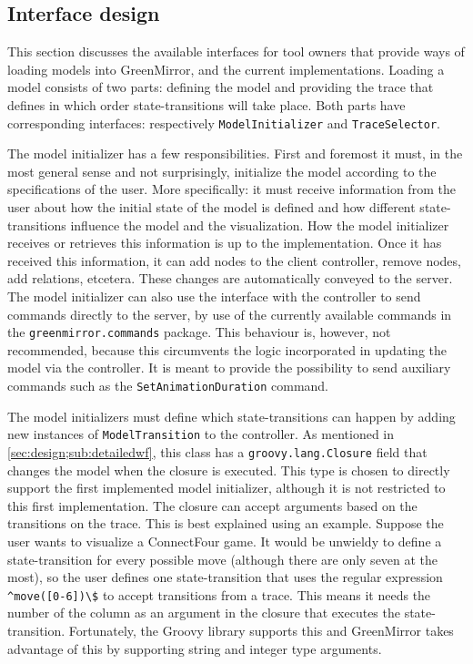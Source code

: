 \subsection{Interface design}\label{sec:design;sub:interface}
This section discusses the available interfaces for tool owners that provide ways of loading models into GreenMirror, and the current implementations. Loading a model consists of two parts: defining the model and providing the trace that defines in which order state-transitions will take place. Both parts have corresponding interfaces: respectively \lstinline{ModelInitializer} and \lstinline{TraceSelector}.
\par The model initializer has a few responsibilities. First and foremost it must, in the most general sense and not surprisingly, initialize the model according to the specifications of the user. More specifically: it must receive information from the user about how the initial state of the model is defined and how different state-transitions influence the model and the visualization. How the model initializer receives or retrieves this information is up to the implementation. Once it has received this information, it can add nodes to the client controller, remove nodes, add relations, etcetera. These changes are automatically conveyed to the server. The model initializer can also use the interface with the controller to send commands directly to the server, by use of the currently available commands in the \lstinline{greenmirror.commands} package. This behaviour is, however, not recommended, because this circumvents the logic incorporated in updating the model via the controller. It is meant to provide the possibility to send auxiliary commands such as the \lstinline{SetAnimationDuration} command.
\par The model initializers must define which state-transitions can happen by adding new instances of \lstinline{ModelTransition} to the controller. As mentioned in \cref{sec:design;sub:detailedwf}, this class has a \lstinline{groovy.lang.Closure} field that changes the model when the closure is executed. This type is chosen to directly support the first implemented model initializer, although it is not restricted to this first implementation. The closure can accept arguments based on the transitions on the trace. This is best explained using an example. Suppose the user wants to visualize a ConnectFour game. It would be unwieldy to define a state-transition for every possible move (although there are only seven at the most), so the user defines one state-transition that uses the regular expression \lstinline{^move([0-6])\$} to accept transitions from a trace. This means it needs the number of the column as an argument in the closure that executes the state-transition. Fortunately, the Groovy library supports this and GreenMirror takes advantage of this by supporting string and integer type arguments.
